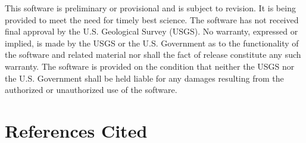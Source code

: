 \documentclass[11pt,twoside,twocolumn]{usgsreport}
\begin{document}
This software is preliminary or provisional and is subject to revision. It is being provided to meet the need for timely best science. The software has not received final approval by the U.S. Geological Survey (USGS). No warranty, expressed or implied, is made by the USGS or the U.S. Government as to the functionality of the software and related material nor shall the fact of release constitute any such warranty. The software is provided on the condition that neither the USGS nor the U.S. Government shall be held liable for any damages resulting from the authorized or unauthorized use of the software.

\section{References Cited}
\end{document}

